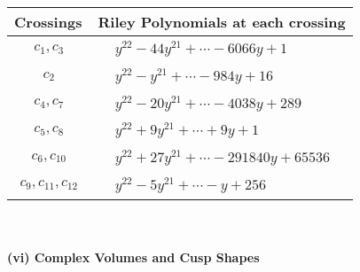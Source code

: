 \documentclass[1p]{elsarticle_modified}
\theoremstyle{definition}
\begin{document}
\begin{tabular}{m{50pt}|m{274pt}}
Crossings & \hspace{64pt}Riley Polynomials at each crossing \\
\hline $$\begin{aligned}c_{1},c_{3}\end{aligned}$$&$\begin{aligned}
&y^{22}-44 y^{21}+\cdots-6066 y+1
\end{aligned}$\\
\hline $$\begin{aligned}c_{2}\end{aligned}$$&$\begin{aligned}
&y^{22}- y^{21}+\cdots-984 y+16
\end{aligned}$\\
\hline $$\begin{aligned}c_{4},c_{7}\end{aligned}$$&$\begin{aligned}
&y^{22}-20 y^{21}+\cdots-4038 y+289
\end{aligned}$\\
\hline $$\begin{aligned}c_{5},c_{8}\end{aligned}$$&$\begin{aligned}
&y^{22}+9 y^{21}+\cdots+9 y+1
\end{aligned}$\\
\hline $$\begin{aligned}c_{6},c_{10}\end{aligned}$$&$\begin{aligned}
&y^{22}+27 y^{21}+\cdots-291840 y+65536
\end{aligned}$\\
\hline $$\begin{aligned}c_{9},c_{11},c_{12}\end{aligned}$$&$\begin{aligned}
&y^{22}-5 y^{21}+\cdots- y+256
\end{aligned}$\\
\hline
\end{tabular}\\~\\
\newpage\flushleft \textbf{(vi) Complex Volumes and Cusp Shapes}
\end{document}
